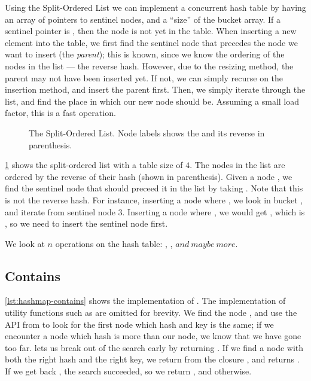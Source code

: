 Using the Split-Ordered List we can implement a concurrent hash table by having an array of
pointers to sentinel nodes, and a ``size'' of the bucket array. If a sentinel pointer is
, then the node is not yet in the table. When inserting a new element into the table, we
first find the sentinel node that precedes the node we want to insert (the \emph{parent}); this is
known, since we know the ordering of the nodes in the list --- the reverse hash. However, due to
the resizing method, the parent may not have been inserted yet. If not, we can simply recurse on
the insertion method, and insert the parent first. Then, we simply iterate through the list, and
find the place in which our new node should be. Assuming a small load factor, this is a fast
operation.

\begin{figure}[ht]
\centering

\caption{The Split-Ordered List. Node labels shows the  and its reverse in
parenthesis.\label{fig:split-order-list}}
\end{figure}

\cref{fig:split-order-list} shows the split-ordered list with a table size of $4$. The nodes in the
list are ordered by the reverse of their hash (shown in parenthesis). Given a node , we
find the sentinel node that should preceed it in the list by taking .
Note that this is not the reverse hash. For instance,
inserting a node where , we look in bucket , and iterate from
sentinel node 3.
Inserting a node where , we would get , which is ,
so we need to insert the sentinel node first.


We look at $n$ operations on the hash table: , , $and\ maybe\ more$.

\subsection{Contains}

\cref{lst:hashmap-contains} shows the implementation of . The
implementation of utility functions such as  are omitted for brevity.  We
find the  node , and use the  API from 
 to look for the first node which hash and key is the same; if we encounter a node
which hash is more than our node, we know that we have gone too far. 
lets us break out of the search early by returning  . If we find a node
with both the right hash and the right key, we return  from the
closure , and  returns . If we get back , the
search succeeded, so we return , and  otherwise.



